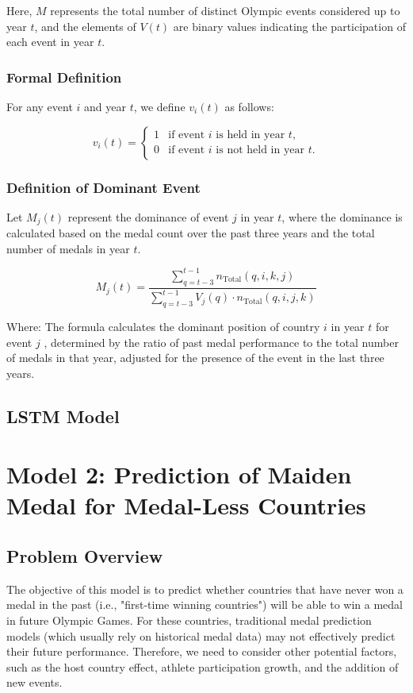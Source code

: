 \documentclass{mcmthesis}
\begin{document}
Here, \( M \) represents the total number of distinct Olympic events considered up to year \( t \), and the elements of \( V(t) \) are binary values indicating the participation of each event in year \( t \).

\subsubsection{Formal Definition}

For any event \( i \) and year \( t \), we define \( v_i(t) \) as follows:

\[
v_i(t) =
\begin{cases}
	1 & \text{if event } i \text{ is held in year } t, \\
	0 & \text{if event } i \text{ is not held in year } t.
\end{cases}
\]


\subsubsection{Definition of Dominant Event}

Let \( M_j(t) \) represent the dominance of event \( j \) in year \( t \), where the dominance is calculated based on the medal count over the past three years and the total number of medals in year \( t \).

\[
M_j(t) = \frac{\sum_{q=t-3}^{t-1} n_{\text{Total}}(q,i,k,j)}{\sum_{q=t-3}^{t-1}V_j(q) \cdot n_{\text{Total}}(q,i,j,k)} 
\]

Where:
The formula calculates the dominant position of country $i$ in year  $t$  for event  $j$ , determined by the ratio of past medal performance to the total number of medals in that year, adjusted for the presence of the event in the last three years.

\subsection{LSTM Model}







\section{Model 2: Prediction of Maiden Medal for Medal-Less Countries}
\subsection{Problem Overview}
The objective of this model is to predict whether countries that have never won a medal in the past (i.e., "first-time winning countries") will be able to win a medal in future Olympic Games. For these countries, traditional medal prediction models (which usually rely on historical medal data) may not effectively predict their future performance. Therefore, we need to consider other potential factors, such as the host country effect, athlete participation growth, and the addition of new events.
\end{document}

